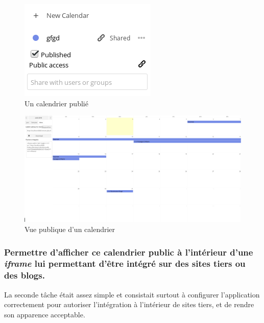 \documentclass[10pt,a4paper]{report}
\begin{document}
	\begin{figure}
		\includegraphics[width=0.5\paperwidth]{images/fonctionnalitepublie.png}
		\caption*{Un calendrier publié}
		\label{normal_case}
	\end{figure}

	
	\begin{figure}[ht]
		\centering
		\includegraphics[width=1\textwidth]{images/calendrier-vue-publique.png}
		\caption*{Vue publique d'un calendrier}
		\label{normal_case}
	\end{figure}

	
	\subsubsection{ Permettre d'afficher ce calendrier public à l'intérieur d'une \textit{iframe} lui permettant d'être intégré sur des sites tiers ou des blogs.}La seconde tâche était assez simple et consistait surtout à configurer l'application correctement pour autoriser l'intégration à l'intérieur de sites tiers, et de rendre son apparence acceptable.
	
\end{document}
